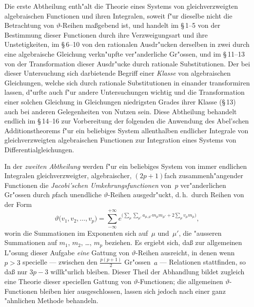 \documentclass[12pt,a4paper]{article}
\begin{document}
Die erste Abtheilung enth"alt die Theorie eines Systems von
gleichverzweigten algebraischen Functionen und ihren Integralen, soweit
f"ur dieselbe nicht die Betrachtung von $\vartheta$-Reihen ma\ss{}gebend ist, und
handelt im \S\,1--5 von der Bestimmung dieser Functionen durch ihre
Verzweigungsart und ihre Unstetigkeiten, im \S\,6--10 von den rationalen
Ausdr"ucken derselben in zwei durch eine algebraische Gleichung verkn"upfte
ver"anderliche Gr"ossen, und im \S\,11--13 von der Transformation dieser
Ausdr"ucke durch rationale Substitutionen. Der bei dieser Untersuchung
sich darbietende Begriff einer \emph{Klasse} von algebraischen Gleichungen,
welche sich durch rationale Substitutionen in einander transformiren lassen,
d"urfte auch f"ur andere Untersuchungen wichtig und die Transformation
einer solchen Gleichung in Gleichungen niedrigsten Grades ihrer Klasse
(\S\,13) auch bei anderen Gelegenheiten von Nutzen sein. Diese Abtheilung
behandelt endlich im \S\,14--16 zur Vorbereitung der folgenden die
Anwendung des Abel'schen Additionstheorems f"ur ein beliebiges System
allenthalben endlicher Integrale von gleichverzweigten algebraischen
Functionen zur Integration eines Systems von Differentialgleichungen.

In der \emph{zweiten Abtheilung} werden f"ur ein beliebiges System von
immer endlichen Integralen gleichverzweigter, algebraischer, $(2p+1)$fach
zusammenh"angender Functionen die \emph{Jacobi'schen Umkehrungsfunctionen}
von~$p$ ver"anderlichen Gr"ossen durch $p$fach unendliche $\vartheta$-Reihen
ausgedr"uckt, d.\,h.\ durch Reihen von der Form
\[
\vartheta\bigl(v_1, v_2, \ldots, v_p\bigr) =
\sum_{-\infty}^{+\infty} e^{\bigl(\sum_{\mu} \sum_{\mu'}
  a_{\mu,\mu'} m_\mu m_{\mu'} + 2\sum_\mu v_\mu m_\mu\bigr)}\!,
\]
worin die Summationen im Exponenten sich auf~$\mu$ und~$\mu'$, die "ausseren
Summationen auf $m_1$, $m_2$, \ldots, $m_p$ beziehen. Es ergiebt sich, da\ss{}
zur allgemeinen L"osung dieser Aufgabe \emph{eine} Gattung von
$\vartheta$-Reihen ausreicht, in denen wenn $p > 3$ specielle --- zwischen
den $\frac{p(p+1)}{2}$ Gr"ossen~$a$ --- Relationen stattfinden, so da\ss{} nur
$3p - 3$ willk"urlich bleiben. Dieser Theil der Abhandlung bildet zugleich
eine Theorie dieser speciellen Gattung von $\vartheta$-Functionen; die allgemeinen
$\vartheta$-Functionen bleiben hier ausgeschlossen, lassen sich jedoch nach einer
ganz "ahnlichen Methode behandeln.
\end{document}
